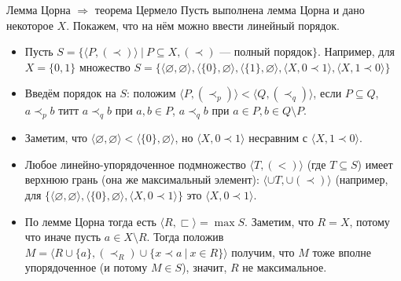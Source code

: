 \documentclass[aspectratio=169]{beamer}
\newtheorem{thm}{Теорема}[section]
\begin{document}
\begin{frame}{Лемма Цорна $\Rightarrow$ теорема Цермело}
Пусть выполнена лемма Цорна и дано некоторое $X$. Покажем, что на нём можно ввести линейный порядок.
\begin{itemize}
\item Пусть $S = \{ \langle P, (\prec)\rangle \ |\ P \subseteq X, (\prec)\text{ --- полный порядок} \}$.
Например, для $X = \{0,1\}$ множество
$S = \{
\langle\varnothing,\varnothing\rangle,
\langle \{0\},\varnothing\rangle,
\langle\{1\},\varnothing\rangle,
\langle X, 0 \prec 1\rangle,
\langle X, 1 \prec 0\rangle
\}$

\item Введём порядок на $S$: положим $\langle P, (\prec_p)\rangle < \langle Q, (\prec_q)\rangle$, если $P \subseteq Q$,
$a \prec_p b$ титт $a \prec_q b$ при $a,b \in P$, $a \prec_q b$ при $a \in P, b \in Q\setminus P$.

\item Заметим, что $\langle \varnothing,\varnothing \rangle < \langle \{0\},\varnothing\rangle$,
но $\langle X, 0 \prec 1\rangle$ несравним с $\langle X, 1 \prec 0\rangle$.

\item Любое линейно-упорядоченное подмножество $\langle T, (<) \rangle$ (где $T \subseteq S$) имеет
верхнюю грань (она же максимальный элемент): $\langle \cup T, \cup(\prec)\rangle$ (например, 
для $\{\langle\varnothing,\varnothing\rangle,
\langle \{0\},\varnothing\rangle,
\langle X, 0 \prec 1\rangle\}$ это $\langle X, 0 \prec 1\rangle$.

\item По лемме Цорна тогда есть $\langle R, \sqsubset\rangle = \max S$. Заметим, что $R = X$, потому что иначе пусть
$a \in X\setminus R$. Тогда положив $M = \langle R\cup\{a\}, (\prec_R)\cup\{x\prec a\ |\ x \in R\} \rangle$
получим, что $M$ тоже вполне упорядоченное (и потому $M \in S$), значит, $R$ не максимальное.
\end{itemize}
\end{frame}
\end{document}

